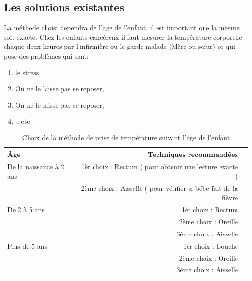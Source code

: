 \documentclass[12pt]{article}
\begin{document}
\subsection{Les solutions existantes}
La méthode choisi dependra de l’age de l’enfant, il est important que la mesure soit exacte. Chez les enfants cancéreux il faut mesurer la température corporelle chaque deux heures par l’infirmière ou le garde malade (Mère ou sœur) ce qui pose des problèmes qui sont:
\begin{enumerate}
	\item le stress,
	\item On ne le laisse pas se reposer,
	\item On ne le laisse pas se reposer,
	\item ...etc
\end{enumerate}
\newpage
\begin{table}[h]
	\centering
	\caption{Choix de la méthode de prise de température suivant l’age de l’enfant}
	\begin{tabular}{ | l | r | c }
		\hline
		\bfseries{Âge} & \bfseries{Techniques recommandées}\\ \hline
		De la naissance à 2 ans & 1èr choix : Rectum ( pour obtenir une lecture exacte )\\
		                                      &  2ème choix : Aisselle ( pour vérifier si bébé fait de la fièvre\\
\hline
		De 2 à 5 ans & 1èr choix : Rectum\\
							& 2ème choix : Oreille\\
							& 3ème choix : Aisselle\\ 
\hline
		Plus de 5 ans & 1èr choix : Bouche\\
							  & 2ème choix : Oreille\\
							  & 3ème choix : Aisselle\\ 
\hline 
	\end{tabular}
\end{table}
\end{document}
